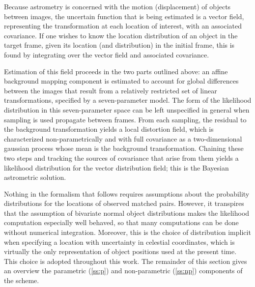 \documentclass[manuscript]{aastex}
\newcommand{\bsS}{\boldsymbol\Sigma}
\begin{document}
Because astrometry is concerned with the motion (displacement) of objects between images, the uncertain function that is being estimated is a vector field, representing the transformation at each location of interest, with an associated covariance. If one wishes to know the location distribution of an object in the target frame, given its location (and distribution) in the initial frame, this is found by integrating over the vector field and associated covariance. %

Estimation of this field proceeds in the two parts outlined above: an affine background mapping component is estimated to account for global differences between the images that result from a relatively restricted set of linear transformations, specified by a seven-parameter model. The form of the likelihood distribution in this seven-parameter space can be left unspecified in general when sampling is used propagate between frames. From each sampling, the residual to the background transformation yields a local distortion field, which is characterized non-parametrically and with full covariance as a two-dimensional gaussian process whose mean is the background transformation. Chaining these two steps and tracking the sources of covariance that arise from them yields a likelihood distribution for the vector distribution field; this is the Bayesian astrometric solution.

Nothing in the formalism that follows requires assumptions about the probability distributions for the locations of observed matched pairs. However, it transpires that the assumption of bivariate normal object distributions makes the likelihood computation especially well behaved, so that many computations can be done without numerical integration. Moreover, this is the choice of distribution implicit when specifying a location with uncertainty in celestial coordinates, which is virtually the only representation of object positions used at the present time. This choice is adopted throughout this work. The remainder of this section gives an overview the parametric (\ref{ss:p}) and non-parametric (\ref{ss:np}) components of the scheme.
\end{document}

